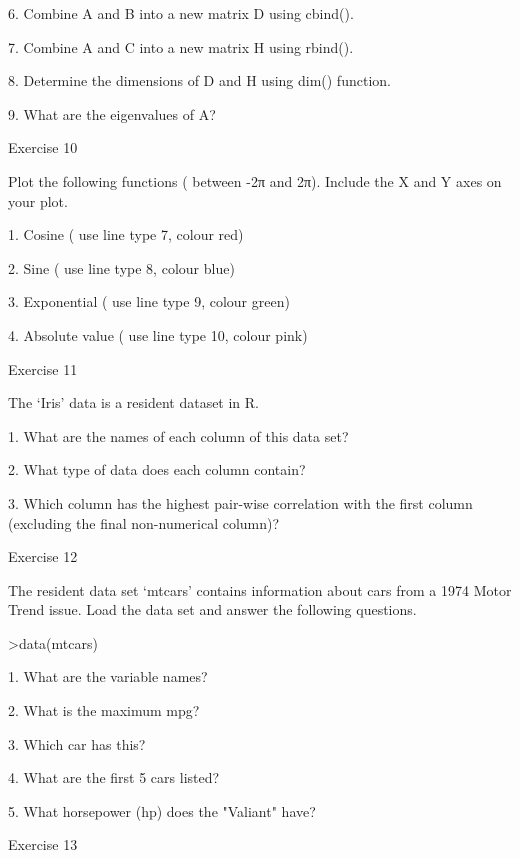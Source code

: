 6.
Combine A and B into a new matrix D using cbind().

7.
Combine A and C into a new matrix H using rbind().

8.
Determine the dimensions of D and H using dim() function.

9.
What are the eigenvalues of A?


  

Exercise 10

 

Plot the following functions ( between -2π and 2π). Include the X and Y axes on your plot.

 

1.    Cosine                              ( use line type 7, colour  red)

2.    Sine                                  ( use line type 8, colour blue)

3.    Exponential                      ( use line type 9, colour green)

4.     Absolute value                 ( use line type 10, colour pink)

 

Exercise 11

 

The ‘Iris’ data is a resident dataset in R.

 
1.
What are the names of each column of this data set?

2.
What type of data does each column contain?

3.
Which column has the highest pair-wise correlation with the first column (excluding the final non-numerical column)?


 

Exercise 12

 

The resident data set ‘mtcars’ contains information about cars from a 1974 Motor Trend issue. Load the data set and answer the following questions.

>data(mtcars)

 

1. What are the variable names?

2. What is the maximum mpg?

3. Which car has this?

4. What are the first 5 cars listed?

5. What horsepower (hp) does the "Valiant" have?

 

 

Exercise 13

